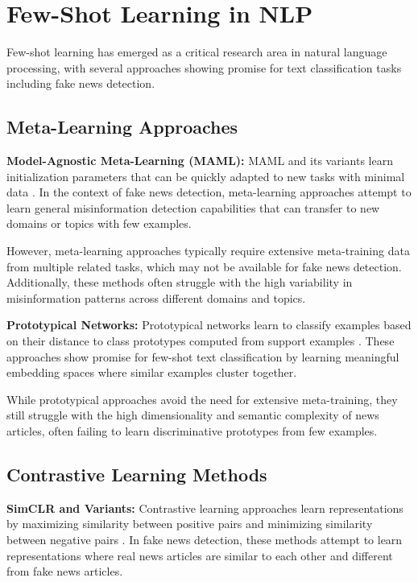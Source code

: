 \section{Few-Shot Learning in NLP}

Few-shot learning has emerged as a critical research area in natural language processing, with several approaches showing promise for text classification tasks including fake news detection.

\subsection{Meta-Learning Approaches}

\textbf{Model-Agnostic Meta-Learning (MAML):} MAML and its variants learn initialization parameters that can be quickly adapted to new tasks with minimal data \cite{finn2017model, bansal2020self}. In the context of fake news detection, meta-learning approaches attempt to learn general misinformation detection capabilities that can transfer to new domains or topics with few examples.

However, meta-learning approaches typically require extensive meta-training data from multiple related tasks, which may not be available for fake news detection. Additionally, these methods often struggle with the high variability in misinformation patterns across different domains and topics.

\textbf{Prototypical Networks:} Prototypical networks learn to classify examples based on their distance to class prototypes computed from support examples \cite{snell2017prototypical, gao2019fewrel}. These approaches show promise for few-shot text classification by learning meaningful embedding spaces where similar examples cluster together.

While prototypical approaches avoid the need for extensive meta-training, they still struggle with the high dimensionality and semantic complexity of news articles, often failing to learn discriminative prototypes from few examples.

\subsection{Contrastive Learning Methods}

\textbf{SimCLR and Variants:} Contrastive learning approaches learn representations by maximizing similarity between positive pairs and minimizing similarity between negative pairs \cite{chen2020simple, gao2021simcse}. In fake news detection, these methods attempt to learn representations where real news articles are similar to each other and different from fake news articles.

